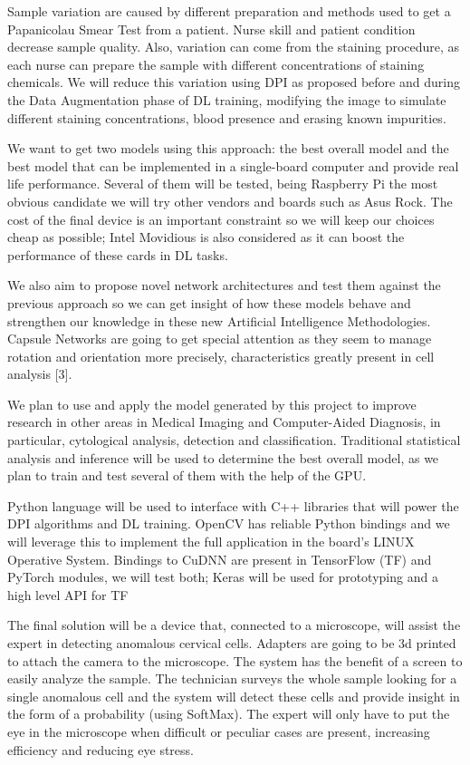 Sample variation are caused by different preparation and methods used to get a
Papanicolau Smear Test from a patient. Nurse skill and patient condition
decrease sample quality. Also, variation can come from the staining procedure,
as each nurse can prepare the sample with different concentrations of staining
chemicals. We will reduce this variation using DPI as proposed before and during
the Data Augmentation phase of DL training, modifying the image to simulate
different staining concentrations, blood presence and erasing known impurities. 

We want to get two models using this approach: the best overall model and the
best model that can be implemented in a single-board computer and provide real
life performance. Several of them will be tested, being Raspberry Pi the most
obvious candidate we will try other vendors and boards such as Asus Rock. The
cost of the final device is an important constraint so we will keep our choices
cheap as possible; Intel Movidious is also considered as it can boost the
performance of these cards in DL tasks.

We also aim to propose novel network architectures and test them against the
previous approach so we can get insight of how these models behave and
strengthen our knowledge in these new Artificial Intelligence Methodologies.
Capsule Networks are going to get special attention as they seem to manage
rotation and orientation more precisely, characteristics greatly present in cell
analysis [3].

We plan to use and apply the model generated by this project to improve research
in other areas in Medical Imaging and Computer-Aided Diagnosis, in particular,
cytological analysis, detection and classification. Traditional statistical
analysis and inference will be used to determine the best overall model, as we
plan to train and test several of them with the help of the GPU. 

Python language will be used to interface with C++ libraries that will power the
DPI algorithms and DL training. OpenCV has reliable Python bindings and we will
leverage this to implement the full application in the board’s LINUX Operative
System. Bindings to CuDNN are present in TensorFlow (TF) and PyTorch modules, we
will test both; Keras will be used for prototyping and a high level API for TF 

The final solution will be a device that, connected to a microscope, will assist
the expert in detecting anomalous cervical cells. Adapters are going to be 3d
printed to attach the camera to the microscope. The system has the benefit of a
screen to easily analyze the sample. The technician surveys the whole sample
looking for a single anomalous cell and the system will detect these cells and
provide insight in the form of a probability (using SoftMax). The expert will
only have to put the eye in the microscope when difficult or peculiar cases are
present, increasing efficiency and reducing eye stress.

